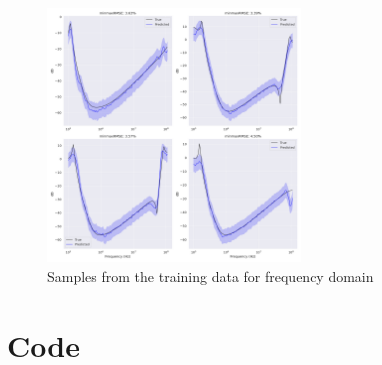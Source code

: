 \documentclass{article}
\begin{document}
\begin{figure}[h]
    \centering
    \includegraphics[width=0.6\textwidth]{../plots/prediction_transformer.png}
    \caption{Samples from the training data for frequency domain}
    \label{fig:training_samples}
\end{figure}
\section{Code}

\cite{alvarez2012kernels} \cite{raissi2017physicsIDL}

\newpage
\printbibliography
\end{document}
